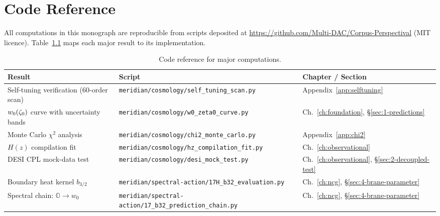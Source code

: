 
\chapter{Code Reference}
\label{app:code-reference}

All computations in this monograph are reproducible from scripts deposited at \url{https://github.com/Multi-DAC/Corpus-Perspectival} (MIT licence). Table~\ref{tab:code-ref} maps each major result to its implementation.

\begin{table}[h!]
\caption{Code reference for major computations.}
\label{tab:code-ref}
\small
\renewcommand{\arraystretch}{1.25}
\begin{tabular}{@{}p{4.5cm}p{5.5cm}p{5cm}@{}}
\toprule
\textbf{Result} & \textbf{Script} & \textbf{Chapter / Section} \\
\midrule

Self-tuning verification (60-order scan) &
\texttt{meridian/cosmology/self\_tuning\_scan.py} &
Appendix~\ref{app:selftuning} \\

$w_0(\zeta_0)$ curve with uncertainty bands &
\texttt{meridian/cosmology/w0\_zeta0\_curve.py} &
Ch.~\ref{ch:foundation}, \S\ref{sec:1-predictions} \\

Monte Carlo $\chi^2$ analysis &
\texttt{meridian/cosmology/chi2\_monte\_carlo.py} &
Appendix~\ref{app:chi2} \\

$H(z)$ compilation fit &
\texttt{meridian/cosmology/hz\_compilation\_fit.py} &
Ch.~\ref{ch:observational} \\

DESI CPL mock-data test &
\texttt{meridian/cosmology/desi\_mock\_test.py} &
Ch.~\ref{ch:observational}, \S\ref{sec:2-decoupled-test} \\

Boundary heat kernel $b_{3/2}$ &
\texttt{meridian/spectral-action/17H\_b32\_evaluation.py} &
Ch.~\ref{ch:ncg}, \S\ref{sec:4-brane-parameter} \\

Spectral chain: $\mathbb{O} \to w_0$ &
\texttt{meridian/spectral-action/17\_b32\_prediction\_chain.py} &
Ch.~\ref{ch:ncg}, \S\ref{sec:4-brane-parameter} \\


\end{tabular}
\end{table}
